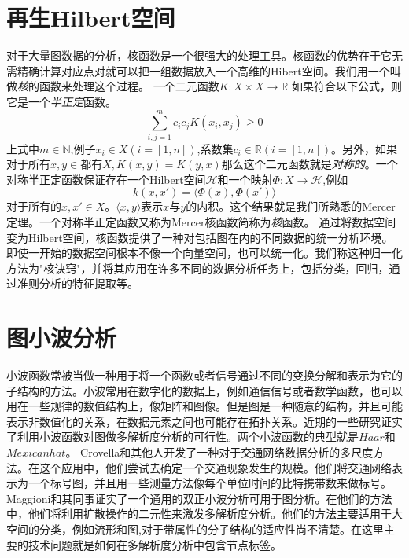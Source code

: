 \documentclass{article}
\begin{document}
\section{再生Hilbert空间}
对于大量图数据的分析，核函数是一个很强大的处理工具。核函数的优势在于它无需精确计算对应点对就可以把一组数据放入一个高维的Hibert空间。我们用一个叫做\emph{核}的函数来处理这个过程。
一个二元函数$K:X\times X\rightarrow \mathbb{R}$ 如果符合以下公式，则它是一个\emph{半正定}函数。
\begin{equation}
    \sum_{i,j=1}^{m}c_i c_j K(x_i ,x_j )\geq 0
\end{equation}
上式中$m\in \mathbb{N}$,例子$x_i \in X(i=[1,n])$,系数集$c_i \in \mathbb{R}(i=[1,n])$。另外，如果$对于所有x,y\in 都有X,K(x,y)=K(y,x)$那么这个二元函数就是\emph{对称的}。一个对称半正定函数保证存在一个Hilbert空间$\mathcal{H}$和一个映射$\Phi:X\rightarrow \mathcal{H} $,例如
\begin{equation}
    k(x,x')=\langle\Phi(x),\Phi(x')\rangle
\end{equation}
对于所有的$x,x'\in X $。$\langle x,y\rangle$表示$x$与$y$的内积。这个结果就是我们所熟悉的Mercer定理。一个对称半正定函数又称为Mercer核函数简称为\emph{核}函数。
通过将数据空间变为Hilbert空间，核函数提供了一种对包括图在内的不同数据的统一分析环境。即使一开始的数据空间根本不像一个向量空间，也可以统一化。我们称这种归一化方法为"核诀窍"，并将其应用在许多不同的数据分析任务上，包括分类，回归，通过准则分析的特征提取等。
\section{图小波分析}
小波函数常被当做一种用于将一个函数或者信号通过不同的变换分解和表示为它的子结构的方法。小波常用在数字化的数据上，例如通信信号或者数学函数，也可以用在一些规律的数值结构上，像矩阵和图像。但是图是一种随意的结构，并且可能表示非数值化的关系，在数据元素之间也可能存在拓扑关系。近期的一些研究证实了利用小波函数对图做多解析度分析的可行性。两个小波函数的典型就是$Haar$和$Mexican hat$。
Crovella和其他人开发了一种对于交通网络数据分析的多尺度方法。在这个应用中，他们尝试去确定一个交通现象发生的规模。他们将交通网络表示为一个标号图，并且用一些测量方法像每个单位时间的比特携带数来做标号。
Maggioni和其同事证实了一个通用的双正小波分析可用于图分析。在他们的方法中，他们将利用扩散操作的二元性来激发多解析度分析。他们的方法主要适用于大空间的分类，例如流形和图,对于带属性的分子结构的适应性尚不清楚。在这里主要的技术问题就是如何在多解析度分析中包含节点标签。


\ifx\allfiles\undefined
%
%
\end{document}
